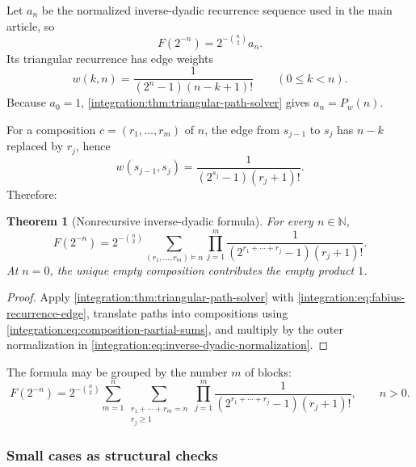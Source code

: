 \documentclass[11pt,oneside]{article}
\newtheorem{theorem}{Theorem}[section]
\theoremstyle{definition}
\theoremstyle{remark}
\newcommand{\N}{\mathbb N}
\begin{document}
Let $a_n$ be the normalized inverse-dyadic recurrence sequence used in the main article, so
\begin{equation}
 F(2^{-n})=2^{-\binom n2}a_n.
 \label{integration:eq:inverse-dyadic-normalization}
\end{equation}
Its triangular recurrence has edge weights
\begin{equation}
 w(k,n)=\frac{1}{(2^n-1)(n-k+1)!}
 \qquad(0\le k<n).
 \label{integration:eq:fabius-recurrence-edge}
\end{equation}
Because $a_0=1$, \cref{integration:thm:triangular-path-solver} gives $a_n=P_w(n)$.

For a composition $c=(r_1,\ldots,r_m)$ of $n$, the edge from $s_{j-1}$ to $s_j$ has
$n-k$ replaced by $r_j$, hence
\begin{equation}
 w(s_{j-1},s_j)=\frac{1}{(2^{s_j}-1)(r_j+1)!}.
 \label{integration:eq:fabius-composition-edge}
\end{equation}
Therefore:

\begin{theorem}[Nonrecursive inverse-dyadic formula]
\label{integration:thm:composition-inverse-dyadic}
For every $n\in\N$,
\begin{equation}
 F(2^{-n})=
 2^{-\binom n2}
 \sum_{(r_1,\ldots,r_m)\models n}
 \prod_{j=1}^{m}
 \frac{1}{(2^{r_1+\cdots+r_j}-1)(r_j+1)!}.
 \label{integration:eq:composition-inverse-dyadic}
\end{equation}
At $n=0$, the unique empty composition contributes the empty product $1$.
\end{theorem}

\begin{proof}
Apply \cref{integration:thm:triangular-path-solver} with \eqref{integration:eq:fabius-recurrence-edge}, translate
paths into compositions using \eqref{integration:eq:composition-partial-sums}, and multiply by the outer
normalization in \eqref{integration:eq:inverse-dyadic-normalization}.
\end{proof}

The formula may be grouped by the number $m$ of blocks:
\begin{equation}
 F(2^{-n})=
 2^{-\binom n2}
 \sum_{m=1}^{n}
 \sum_{\substack{r_1+\cdots+r_m=n\\r_j\ge1}}
 \prod_{j=1}^{m}
 \frac{1}{(2^{r_1+\cdots+r_j}-1)(r_j+1)!},
 \qquad n>0.
 \label{integration:eq:composition-by-length}
\end{equation}

\subsubsection{Small cases as structural checks}
\end{document}
